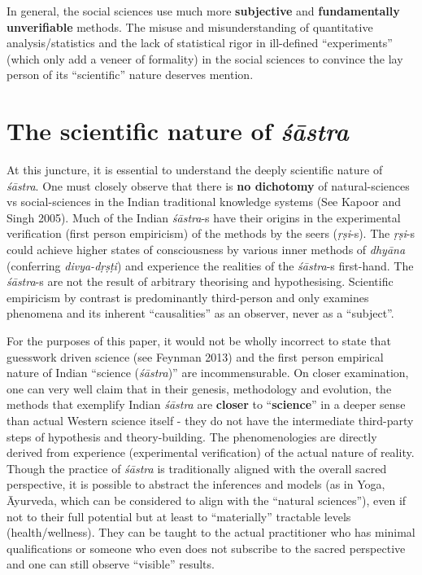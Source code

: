In general, the social sciences use much more {\bf subjective} and {\bf fundamentally unverifiable} methods. The misuse and misunderstanding of quantitative analysis/statistics and the lack of statistical rigor in ill-defined ``experiments'' (which only add a veneer of formality) in the social sciences to convince the lay person of its ``scientific'' nature deserves mention.

\section*{The scientific nature of {\sl\bfseries śāstra}}

At this juncture, it is essential to understand the deeply scientific nature of {\sl śāstra}. One must closely observe that there is {\bf no dichotomy} of natural-sciences vs social-sciences in the Indian traditional knowledge systems (See Kapoor and Singh 2005). Much of the Indian {\sl śāstra}-s have their origins in the experimental verification (first person empiricism) of the methods by the seers ({\sl ṛṣi}-s). The {\sl ṛṣi}-s could achieve higher states of consciousness by various inner methods of {\sl dhyāna} (conferring {\sl divya-dṛṣṭi}) and experience the realities of the {\sl śāstra}-s first-hand. The {\sl śāstra}-s are not the result of arbitrary theorising and hypothesising. Scientific empiricism by contrast is predominantly third-person and only examines phenomena and its inherent ``causalities'' as an observer, never as a ``subject''.

For the purposes of this paper, it would not be wholly incorrect to state that guesswork driven science (see Feynman 2013) and the first person empirical nature of Indian ``science ({\sl śāstra})'' are incommensurable. On closer examination, one can very well claim that in their genesis, methodology and  evolution, the methods that exemplify  Indian  {\sl śāstra} are {\bf closer} to ``{\bf science}'' in a deeper sense than actual Western science itself - they do not have the intermediate third-party steps of hypothesis and theory-building. The phenomenologies are directly derived from experience (experimental verification) of the actual nature of reality. Though the practice of {\sl śāstra} is traditionally aligned with the overall sacred perspective, it is possible to abstract the inferences and models (as in Yoga, Āyurveda, which can be considered to align with the ``natural sciences''), even if not to their full potential but at least to ``materially'' tractable levels (health/wellness). They can be taught to the actual practitioner who has minimal qualifications or someone who even does not subscribe to the sacred perspective and one can still observe ``visible'' results.

